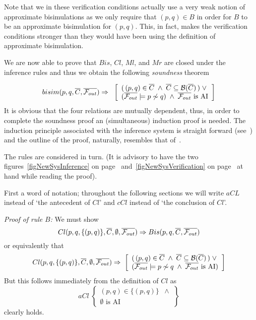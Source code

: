 Note that we in these verification conditions actually use a very weak notion of approximate bisimulations as we only require that $(p,q)\in B$ in order for $B$ to be an approximate bisimulation for $(p,q)$. This,  in fact, makes the verification conditions stronger than they would have been using the definition of approximate bisimulation.

We are now able to prove that $Bis$, $Cl$, $Ml$, and $Mr$ are closed under the inference rules and thus we obtain the following {\em soundness\/} theorem

\begin{theorem}[Soundness]\label{theoNewSysSoundness}
\[
bisim(p,q,\overline{C},\overline{{\cal F}_{out}})\Rightarrow\;\;
\left[
\begin{array}{l}
(\,(p,q)\in \overline{C}\;\wedge\; \overline{C}\subseteq{\cal B}(\overline{C})\,) \;\vee\\
(\overline{{\cal F}_{out}}\models p\not\sim q)\;\wedge\;\overline{{\cal F}_{out}}  \mbox{ is AI}
\end{array}
\right]
\]
\proof It is obvious that the four relations are mutually dependent, thus, in order to complete the soundness proof an (simultaneous) induction proof is needed. The induction principle associated with the inference system is straight forward (see~\cite{Aczel}) and the outline of the proof, naturally, resembles that of~\cite{Larsen}.

The rules are considered in turn. (It is advisory to have the two figures~\ref{figNewSysInference} on page~\pageref{figNewSysInference} and~\ref{figNewSysVerification} on page~\pageref{figNewSysVerification} at hand while reading the proof).

First a word of notation; throughout the following sections we will write $aCL$ instead of `the antecedent of $Cl$' and $cCl$ instead of `the conclusion of $Cl$'.

\begin{trivlist}
\setlength{\labelwidth}{.9cm}
\item[\it Proof of rule\/ $B$:]
We must show
\[
Cl(p,q,\{(p,q)\},\overline{C},\emptyset,\overline{{\cal F}_{out}}) \Rightarrow Bis(p,q,\overline{C},\overline{{\cal F}_{out}})
\]
or equivalently that
\[
Cl(p,q,\{(p,q)\},\overline{C},\emptyset,\overline{{\cal F}_{out}}) \Rightarrow\;
\left[
\begin{array}{l}
(\,(p,q)\in \overline{C}\;\wedge\; \overline{C}\subseteq{\cal B}(\overline{C})\,) \;\vee\\
(\overline{{\cal F}_{out}}\models p\not\sim q\;\wedge\;\overline{{\cal F}_{out}}  \mbox{ is AI})
\end{array}
\right]
\]
But this follows immediately from the definition of $Cl$ as
\[
aCl\; \left\{
\begin{array}{l}
(p,q) \in \{(p,q)\}\;\;\wedge\\
\emptyset\mbox{ is AI}
\end{array}
\right\}
\]
clearly holds.


\end{trivlist}
\end{theorem}
